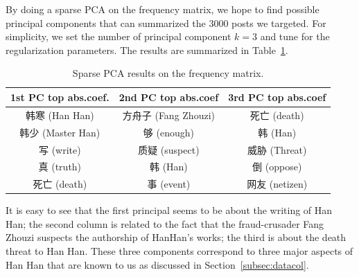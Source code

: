 \documentclass[11pt]{article}
\newcommand{\1}[1]{{\mathbf 1}\left\{#1\right\}}        %
\begin{document}
By doing a sparse PCA on the frequency matrix, we hope to find possible principal components that can summarized the 3000 posts we targeted. For simplicity, we set the number of principal component $k=3$ and tune for the regularization parameters. The results are summarized in Table~\ref{tb:spca}.

\begin{table}[htb]
\caption{Sparse PCA results on the frequency matrix.}
\begin{center}
\begin{tabular}{|c|c|c|}
\hline
1st PC top abs.coef.  &  2nd PC top abs.coef   & 3rd PC top abs.coef \\ \hline
     韩寒 (Han Han)      &       方舟子 (Fang Zhouzi)    &   死亡 (death)\\ \hline
     韩少 (Master Han)   &        够 (enough)        &        韩 (Han)\\ \hline
     写 (write)         &       质疑 (suspect)        &     威胁 (Threat)\\ \hline
     真 (truth)         &         韩 (Han)         &         倒 (oppose)\\ \hline
     死亡 (death)         &       事 (event)      &         网友 (netizen)\\ \hline
\end{tabular}
\end{center}
\label{tb:spca}
\end{table}%



It is easy to see that the first principal seems to be about the writing of Han Han; the second column is related to the fact that the fraud-crusader Fang Zhouzi suspects the authorship of HanHan's works; the third is about the death threat to Han Han. These three components correspond to three major aspects of Han Han that are known to us as discussed in Section~\ref{subsec:datacol}.


\end{document}
